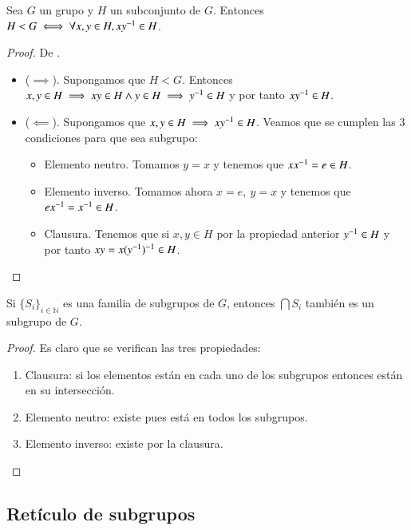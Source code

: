 \begin{thm}
	\label{thm:subgrupoxinverso}
	Sea $G$ un grupo y $H$ un subconjunto de $G$. Entonces $H < G \iff \forall x,y \in H, xy^{-1} \in H$.
\end{thm}


\begin{proof}
	De \cite{dor96}.
	\begin{itemize}
		\item ($\implies$). Supongamos que $H < G$. Entonces $x,y \in H \implies xy \in H \land y \in H \implies y^{-1} \in H$ y por tanto $xy^{-1} \in H$.
		\item ($\impliedby$). Supongamos que $x,y \in H \implies xy^{-1} \in H$. Veamos que se cumplen las 3 condiciones para que sea subgrupo:
		\begin{itemize}
			\item Elemento neutro. Tomamos $y = x$ y tenemos que $xx^{-1} = e \in H$.
			\item Elemento inverso. Tomamos ahora $x = e,\ y = x$ y tenemos que $ex^{-1} = x^{-1} \in H$.
			\item Clausura. Tenemos que si $x,y \in H$ por la propiedad anterior $y^{-1} \in H$ y por tanto $xy = x(y^{-1})^{-1} \in H$.
		\end{itemize}
	\end{itemize}
\end{proof}

\begin{pro}
	Si $\{S_i\}_{i \in \mathbb{N}}$ es una familia de subgrupos de $G$, entonces $\bigcap S_i$ también es un subgrupo de $G$.
\end{pro}

\begin{proof}
	Es claro que se verifican las tres propiedades:
	\begin{enumerate}
		\item Clausura: si los elementos están en cada uno de los subgrupos entonces están en su intersección.
		\item Elemento neutro: existe pues está en todos los subgrupos.
		\item Elemento inverso: existe por la clausura.
	\end{enumerate}
\end{proof}

\subsection{Retículo de subgrupos}

